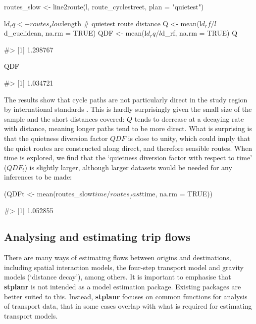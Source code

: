 \begin{Schunk}
\begin{Sinput}
routes_slow <- line2route(l, route_cyclestreet, plan = "quietest")
\end{Sinput}
\end{Schunk}

\begin{Schunk}
\begin{Sinput}
l$d_rq <- routes_slow$length # quietest route distance
Q <- mean(l$d_rf / l$d_euclidean, na.rm = TRUE)
QDF <- mean(l$d_rq / l$d_rf, na.rm = TRUE)
Q
\end{Sinput}
\begin{Soutput}
#> [1] 1.298767
\end{Soutput}
\begin{Sinput}
QDF
\end{Sinput}
\begin{Soutput}
#> [1] 1.034721
\end{Soutput}
\end{Schunk}

The results show that cycle paths are not particularly direct in the
study region by international standards \citep{crow_design_2007}. This
is hardly surprisingly given the small size of the sample and the short
distances covered: \(Q\) tends to decrease at a decaying rate with
distance, meaning longer paths tend to be more direct.
What is surprising is that the quietness diversion factor
\(QDF\) is close to unity, which
could imply that the quiet routes are constructed along direct, and
therefore sensible routes.
When time is
explored, we find that the `quietness diversion factor with respect to
time' (\(QDF_t\)) is slightly larger,
although larger datasets would be needed for any inferences to be made:

\begin{Schunk}
\begin{Sinput}
(QDFt <- mean(routes_slow$time / routes_fast$time, na.rm = TRUE))
\end{Sinput}
\begin{Soutput}
#> [1] 1.052855
\end{Soutput}
\end{Schunk}

\subsection{Analysing and estimating trip flows}\label{models-of-travel-behaviour}

There are many ways of estimating flows between origins and
destinations, including spatial interaction models, the four-step
transport model and gravity models (`distance decay'), among others.
It is important to emphasise that \textbf{stplanr} is not intended as a model estimation package.
Existing packages are better suited to this.
Instead, \textbf{stplanr} focuses on common functions for analysis of transport data, that in some cases overlap with what is required for estimating transport models.

